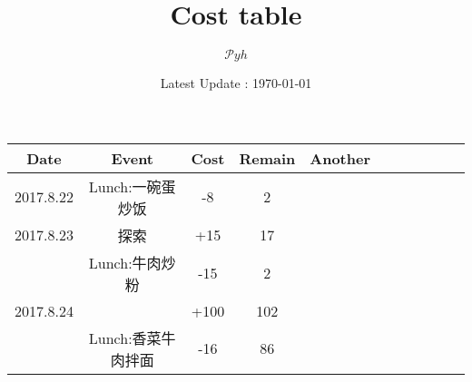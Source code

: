 \documentclass[landscape]{article}
\date{Latest Update : \today}
\title{Cost table}
\author{$\mathcal Pyh$}
\begin{document}
\maketitle

\begin{longtable}{ccccccccccc}
  \hline
  Date & Event & Cost & Remain & Another\\
  \hline
  2017.8.22 & Lunch:一碗蛋炒饭 & {\color{red}-8} & 2 \\
  \hline
  2017.8.23 & 探索 & {\color{cyan}+15} & 17 \\
  & Lunch:牛肉炒粉 & {\color{red}-15} & 2\\
  \hline
  2017.8.24 & & {\color{cyan}+100} & 102\\
  & Lunch:香菜牛肉拌面 & {\color{red}-16} & 86\\
  \hline
\end{longtable}
\end{document}
